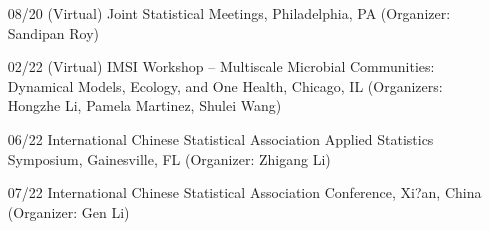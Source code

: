 \documentclass[10pt]{article}
\begin{document}
\begin{enumerate}
\item[08/20] (Virtual) Joint Statistical Meetings, Philadelphia, PA (Organizer: Sandipan Roy)
\item[02/22] (Virtual)  IMSI Workshop -- Multiscale Microbial Communities: Dynamical Models, Ecology, and One Health,
Chicago, IL (Organizers: Hongzhe Li, Pamela Martinez, Shulei Wang)
\item[06/22] International Chinese Statistical Association Applied Statistics Symposium, Gainesville, FL (Organizer: Zhigang Li)
\item[07/22] International Chinese Statistical Association Conference, Xi?an, China (Organizer: Gen Li)

\end{enumerate}
\end{document}
